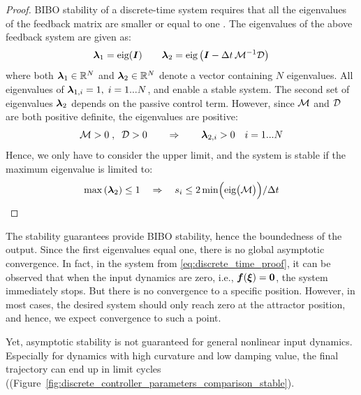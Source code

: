 \begin{proof}
BIBO stability of a discrete-time system requires that all the eigenvalues of the feedback matrix are smaller or equal to one \cite{friedland2012control}.
The eigenvalues of the above feedback system are given as:
\begin{equation}
	\boldsymbol{\lambda}_1 = \text{eig}(\boldsymbol{I}) \qquad \boldsymbol{\lambda}_2 = \text{eig} \left(\boldsymbol{I} - \Delta t \, \mathcal{M}^{-1} \mathcal{D} \right)
\end{equation}
where both $\boldsymbol{\lambda}_1 \in \mathbb{R}^N$ and $\boldsymbol{\lambda}_2 \in \mathbb{R}^N$ denote a vector containing $N$ eigenvalues.
All eigenvalues of $\boldsymbol{\lambda}_{1, i} = 1, \; i = 1...N$, and enable a stable system. 
The second set of eigenvalues $\boldsymbol{\lambda}_2$  depends on the passive control term. 
However, since $\mathcal{M}$ and $\mathcal{D}$ are both positive definite, the eigenvalues are positive:
\begin{equation}
	\mathcal{M} > 0 \; , \;\; \mathcal{D} > 0 
	\qquad \Rightarrow \qquad
	\boldsymbol{\lambda}_{2, i} > 0 \quad i = 1...N
\end{equation}
Hence, we only have to consider the upper limit, and the system is stable if the maximum eigenvalue is limited to:
\begin{equation}
	\max \left(\boldsymbol{\lambda}_2 \right) \leq 1 
	\quad \Rightarrow \quad
	s_{i} \leq 2 \min \Bigl( \text{eig}\bigl(\mathcal{M}\bigr)  \Bigr) / \Delta t
\end{equation}
\end{proof}

The stability guarantees provide BIBO stability, hence the boundedness of the output. 
Since the first eigenvalues equal one, there is no global asymptotic convergence. 
In fact, in the system from \eqref{eq:discrete_time_proof}, it can be observed that when the input dynamics are zero, i.e., $\boldsymbol{f}(\boldsymbol{\xi}) = \boldsymbol{0}$, the system immediately stops. But there is no convergence to a specific position.
However, in most cases, the desired system should only reach zero at the attractor position, and hence, we expect convergence to such a point.

Yet, asymptotic stability is not guaranteed for general nonlinear input dynamics. Especially for dynamics with high curvature and low damping value, the final trajectory can end up in limit cycles ((Figure~\ref{fig:discrete_controller_parameters_comparison_stable}).

